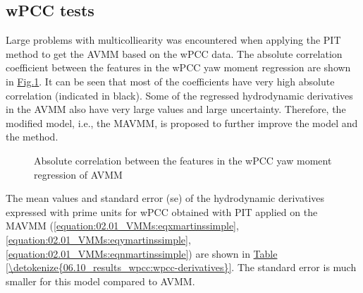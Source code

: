 \documentclass[review]{elsarticle}
\begin{document}
\subsection{wPCC tests}
\label{\detokenize{06.10_results_wpcc:wpcc-tests}}\label{\detokenize{06.10_results_wpcc::doc}}
\sphinxAtStartPar
Large problems with multicolliearity was encountered when applying the PIT method to get the AVMM based on the wPCC data. The absolute correlation coefficient between the features in the wPCC yaw moment regression are shown in \hyperref[\detokenize{06.10_results_wpcc:fig-ncorr}]{Fig.\@ \ref{\detokenize{06.10_results_wpcc:fig-ncorr}}}. It can be seen that most of the coefficients have very high absolute correlation (indicated in black). Some of the regressed hydrodynamic derivatives in the AVMM also have very large values and large uncertainty. Therefore, the modified model, i.e., the MAVMM, is proposed to further improve the model and the method.

\begin{figure}[H]
\centering
\capstart

\noindent{}
\caption{Absolute correlation between the features in the wPCC yaw moment regression of AVMM}\label{\detokenize{06.10_results_wpcc:fig-ncorr}}\end{figure}

\sphinxAtStartPar
The mean values and standard error (se) of the hydrodynamic derivatives expressed with prime units for wPCC obtained with PIT applied on the MAVMM (\autoref{equation:02.01_VMMs:eqxmartinssimple},\autoref{equation:02.01_VMMs:eqymartinssimple}, \autoref{equation:02.01_VMMs:eqnmartinssimple}) are shown in \hyperref[\detokenize{06.10_results_wpcc:wpcc-derivatives}]{Table \ref{\detokenize{06.10_results_wpcc:wpcc-derivatives}}}. The standard error is much smaller for this model compared to AVMM.
\end{document}
